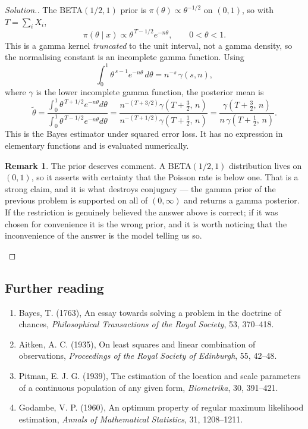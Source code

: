 \documentclass[12pt,a4paper]{report}
\theoremstyle{definition}
\newtheorem*{remark}{Remark}
\newenvironment{solution}
  {\renewcommand{\qedsymbol}{}\begin{proof}[\textit{Solution}.]}
  {\end{proof}}
\begin{document}
\begin{solution}
The BETA$(1/2,1)$ prior is $\pi(\theta)\propto\theta^{-1/2}$ on $(0,1)$, so with
$T=\sum_i X_i$,
\[\pi\left(\theta\mid x\right) \propto \theta^{\,T-1/2}e^{-n\theta},
\qquad 0<\theta<1 .\]
This is a gamma kernel \emph{truncated} to the unit interval, not a gamma
density, so the normalising constant is an incomplete gamma function. Using
\[\int_0^{1}\theta^{\,s-1}e^{-n\theta}\,d\theta = n^{-s}\,\gamma(s,n),\]
where $\gamma$ is the lower incomplete gamma function, the posterior mean is
\[\widetilde{\theta}
= \frac{\int_0^{1}\theta^{\,T+1/2}e^{-n\theta}d\theta}{\int_0^{1}\theta^{\,T-1/2}e^{-n\theta}d\theta}
= \frac{n^{-(T+3/2)}\gamma\left(T+\tfrac32,\,n\right)}{n^{-(T+1/2)}\gamma\left(T+\tfrac12,\,n\right)}
= \frac{\gamma\left(T+\tfrac32,\,n\right)}{n\,\gamma\left(T+\tfrac12,\,n\right)} .\]
This is the Bayes estimator under squared error loss. It has no expression in
elementary functions and is evaluated numerically.

\begin{remark}
The prior deserves comment. A BETA$(1/2,1)$ distribution lives on $(0,1)$, so it
asserts with certainty that the Poisson rate is below one. That is a strong
claim, and it is what destroys conjugacy --- the gamma prior of the previous
problem is supported on all of $(0,\infty)$ and returns a gamma posterior. If
the restriction is genuinely believed the answer above is correct; if it was
chosen for convenience it is the wrong prior, and it is worth noticing that the
inconvenience of the answer is the model telling us so.
\end{remark}
\end{solution}

\subsection*{Further reading}
\begin{enumerate}
\item Bayes, T. (1763), An essay towards solving a problem in the doctrine of
chances, \emph{Philosophical Transactions of the Royal Society}, 53, 370--418.
\item Aitken, A. C. (1935), On least squares and linear combination of
observations, \emph{Proceedings of the Royal Society of Edinburgh}, 55, 42--48.
\item Pitman, E. J. G. (1939), The estimation of the location and scale parameters
of a continuous population of any given form, \emph{Biometrika}, 30, 391--421.
\item Godambe, V. P. (1960), An optimum property of regular maximum likelihood
estimation, \emph{Annals of Mathematical Statistics}, 31, 1208--1211.
\end{enumerate}
\end{document}
